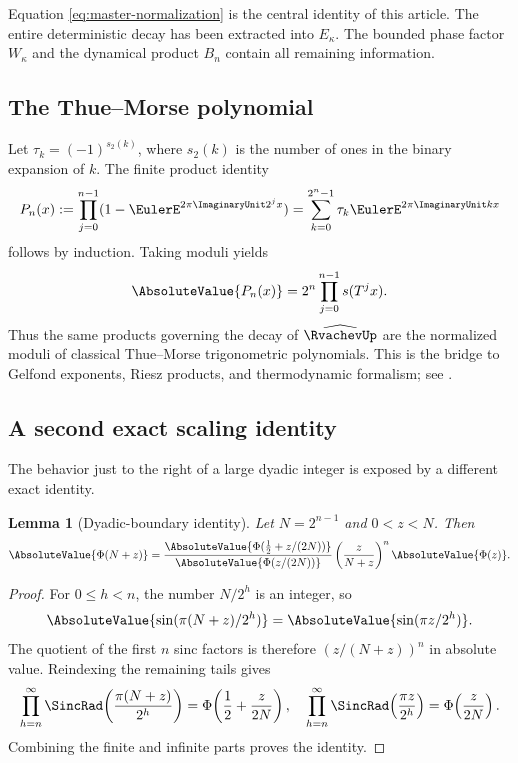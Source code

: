 \documentclass[11pt,oneside]{article}
\newtheorem{lemma}[theorem]{Lemma}
\theoremstyle{definition}
\theoremstyle{remark}
\newcommand{\Phiup}{\Phi}
\begin{document}
Equation \eqref{eq:master-normalization} is the central identity of this article.  The
entire deterministic decay has been extracted into $E_\kappa$.  The bounded phase factor
$W_\kappa$ and the dynamical product $B_n$ contain all remaining information.

\subsection{The Thue--Morse polynomial}

Let $\tau_k=(-1)^{s_2(k)}$, where $s_2(k)$ is the number of ones in the binary expansion of
$k$.  The finite product identity
\begin{equation}
 P_n(x):=\prod_{j=0}^{n-1}(1-\EulerE^{2\pi\ImaginaryUnit2^jx})
 =\sum_{k=0}^{2^n-1}\tau_k\EulerE^{2\pi\ImaginaryUnit kx}
 \label{eq:TM-polynomial}
\end{equation}
follows by induction.  Taking moduli yields
\begin{equation}
 \AbsoluteValue{P_n(x)}=2^n\prod_{j=0}^{n-1}s(T^jx).
 \label{eq:TM-modulus}
\end{equation}
Thus the same products governing the decay of $\widehat{\RvachevUp}$ are the normalized moduli of
classical Thue--Morse trigonometric polynomials.  This is the bridge to Gelfond exponents,
Riesz products, and thermodynamic formalism; see \cite{gelfond,queffelec,fan-schmeling-shen}.

\subsection{A second exact scaling identity}
\label{subsec:boundary-identity}

The behavior just to the right of a large dyadic integer is exposed by a different exact
identity.

\begin{lemma}[Dyadic-boundary identity]
\label{lem:dyadic-boundary}
Let $N=2^{n-1}$ and $0<z<N$.  Then
\begin{equation}
 \AbsoluteValue{\Phiup(N+z)}
 =\frac{\AbsoluteValue{\Phiup(\tfrac12+z/(2N))}}
        {\AbsoluteValue{\Phiup(z/(2N))}}
  \left(\frac{z}{N+z}\right)^n\AbsoluteValue{\Phiup(z)}.
 \label{eq:dyadic-boundary}
\end{equation}
\end{lemma}

\begin{proof}
For $0\le h<n$, the number $N/2^h$ is an integer, so
\[
 \AbsoluteValue{\sin(\pi(N+z)/2^h)}=\AbsoluteValue{\sin(\pi z/2^h)}.
\]
The quotient of the first $n$ sinc factors is therefore $(z/(N+z))^n$ in absolute value.
Reindexing the remaining tails gives
\[
 \prod_{h=n}^{\infty}\SincRad\!\left(\frac{\pi(N+z)}{2^h}\right)
 =\Phiup\!\left(\frac12+\frac{z}{2N}\right),
 \quad
 \prod_{h=n}^{\infty}\SincRad\!\left(\frac{\pi z}{2^h}\right)
 =\Phiup\!\left(\frac{z}{2N}\right).
\]
Combining the finite and infinite parts proves the identity.
\end{proof}
\end{document}
